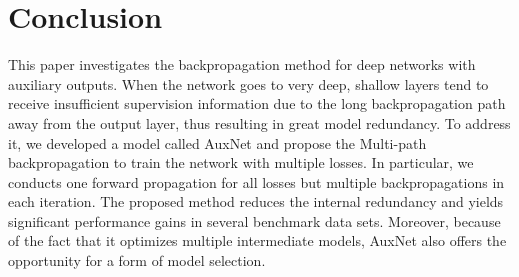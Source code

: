 \documentclass[10pt,onecolumn,letterpaper]{article}
\def\SexyName{AuxNet\xspace}
\begin{document}
\section{Conclusion}
This paper investigates the backpropagation method for deep networks with auxiliary outputs. When the network goes to very deep, shallow layers tend to receive insufficient supervision information due to the long backpropagation path away from the output layer, thus resulting in great model redundancy. To address it, we developed a model called \SexyName and propose the Multi-path backpropagation to train the network with multiple losses. In particular, we conducts one forward propagation for all losses but multiple backpropagations in each iteration. The proposed method reduces the internal redundancy and yields significant performance gains in several benchmark data sets. Moreover, because of the fact that it optimizes multiple intermediate models, \SexyName also offers the opportunity for a form of model selection.

\clearpage
\small

%
\end{document}
